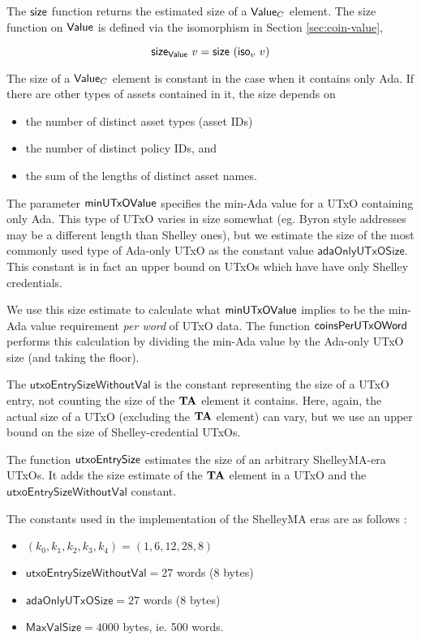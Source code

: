 The $\mathsf{size}$ function returns the estimated size of a $\mathsf{Value}_C$ element. The size
function on $\mathsf{Value}$ is defined via the isomorphism in Section \ref{sec:coin-value},

\[ \mathsf{size}_{\mathsf{Value}}~v=\mathsf{size}~(\mathsf{iso}_{v}~v) \]

The size of a $\mathsf{Value}_C$ element is constant in the case when it contains only Ada.
If there are other types of assets contained in it, the size depends on

\begin{itemize}
  \item the number of distinct asset types (asset IDs)
  \item the number of distinct policy IDs, and
  \item the sum of the lengths of distinct asset names.
\end{itemize}

The parameter $\mathsf{minUTxOValue}$ specifies the min-Ada value for a UTxO containing
only Ada. This type of UTxO varies in size somewhat (eg. Byron style addresses
may be a different length than Shelley ones), but we estimate the size of the most commonly
used type of Ada-only UTxO as the constant value $\mathsf{adaOnlyUTxOSize}$.
This constant is in fact an upper bound on UTxOs which have have only Shelley credentials.

We use this size estimate
to calculate what $\mathsf{minUTxOValue}$ implies to be the min-Ada value requirement
\emph{per word} of UTxO data.
The function $\mathsf{coinsPerUTxOWord}$ performs this calculation by dividing the
min-Ada value by the Ada-only UTxO size (and taking the floor).

The $\mathsf{utxoEntrySizeWithoutVal}$ is the constant representing
the size of a UTxO entry, not counting the size of the $\mathbf{TA}$ element it contains.
Here, again, the actual size of a UTxO (excluding the $\mathbf{TA}$ element) can vary, but
we use an upper bound on the size of Shelley-credential UTxOs.

The function $\mathsf{utxoEntrySize}$ estimates the size of an arbitrary ShelleyMA-era
UTxOs. It adds the size estimate of the $\mathbf{TA}$ element in a UTxO and the
$\mathsf{utxoEntrySizeWithoutVal}$ constant.

The constants used in the implementation of the ShelleyMA eras are as follows :

\begin{itemize}
  \item $(k_0, k_1, k_2, k_3, k_4) = (1, 6, 12, 28, 8)$
  \item $\mathsf{utxoEntrySizeWithoutVal} = 27$ words (8 bytes)
  \item $\mathsf{adaOnlyUTxOSize} = 27$ words (8 bytes)
  \item $\mathsf{MaxValSize} = 4000$ bytes, ie. 500 words.
\end{itemize}

